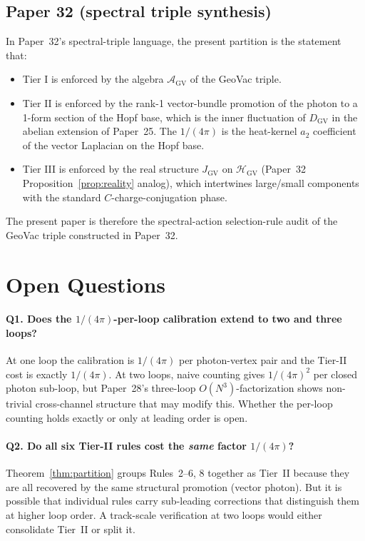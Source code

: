 \documentclass[11pt]{article}
\begin{document}
\subsection{Paper 32 (spectral triple synthesis)}

In Paper~32's spectral-triple language, the present partition is the
statement that:
\begin{itemize}\setlength{\itemsep}{0pt}
\item Tier I is enforced by the algebra $\mathcal{A}_{\mathrm{GV}}$ of
the GeoVac triple.
\item Tier II is enforced by the rank-1 vector-bundle promotion of
the photon to a 1-form section of the Hopf base, which is the inner
fluctuation of $D_{\mathrm{GV}}$ in the abelian extension of
Paper~25.  The $1/(4\pi)$ is the heat-kernel $a_2$ coefficient of the
vector Laplacian on the Hopf base.
\item Tier III is enforced by the real structure $J_{\mathrm{GV}}$
on $\mathcal{H}_{\mathrm{GV}}$ (Paper~32 Proposition~\ref{prop:reality}
analog), which intertwines large/small components with the standard
$C$-charge-conjugation phase.
\end{itemize}

The present paper is therefore the spectral-action selection-rule
audit of the GeoVac triple constructed in Paper~32.

\section{Open Questions}
\label{sec:open}

\paragraph{Q1.  Does the $1/(4\pi)$-per-loop calibration extend to
two and three loops?}  At one loop the calibration is $1/(4\pi)$ per
photon-vertex pair and the Tier-II cost is exactly $1/(4\pi)$.  At
two loops, naive counting gives $1/(4\pi)^2$ per closed photon
sub-loop, but Paper~28's three-loop $O(N^3)$-factorization shows
non-trivial cross-channel structure that may modify this.  Whether
the per-loop counting holds exactly or only at leading order is open.

\paragraph{Q2.  Do all six Tier-II rules cost the \emph{same} factor
$1/(4\pi)$?}  Theorem~\ref{thm:partition} groups Rules~2--6, 8
together as Tier~II because they are all recovered by the same
structural promotion (vector photon).  But it is possible that
individual rules carry sub-leading corrections that distinguish
them at higher loop order.  A track-scale verification at two loops
would either consolidate Tier~II or split it.
\end{document}
